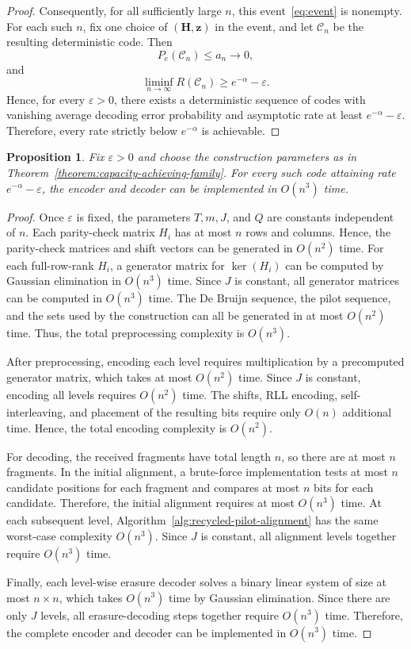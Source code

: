 \documentclass[journal,letterpaper,onecolumn,11pt]{IEEEtran}
\newcommand{\cC}{\mathcal{C}}
\newcommand{\boldz}{\mathbf{z}}
\newcommand{\boldH}{\mathbf{H}}
\newtheorem{proposition}{Proposition}
\begin{document}
\begin{proof}
Consequently, for all sufficiently large \(n\), this event~\eqref{eq:event} is nonempty.
For each such \(n\), fix one choice of \((\boldH,\boldz)\) in the event,
and let \(\cC_n\) be the resulting deterministic code. Then
\[
P_e(\cC_n)\leq a_n\to0,
\]
and
\[
\liminf_{n\to\infty}R(\cC_n)
\geq
e^{-\alpha}-\varepsilon.
\]
Hence, for every \(\varepsilon>0\), there exists a deterministic sequence
of codes with vanishing average decoding error probability and asymptotic
rate at least \(e^{-\alpha}-\varepsilon\). Therefore, every rate strictly
below \(e^{-\alpha}\) is achievable.
\end{proof}

\begin{proposition}\label{proposition:polynomial-time-complexity}
Fix \(\varepsilon>0\) and choose the construction parameters as in
Theorem~\ref{theorem:capacity-achieving-family}. For every such code
attaining rate \(e^{-\alpha}-\varepsilon\), the encoder and decoder can
be implemented in \(O(n^3)\) time.
\end{proposition}
\begin{proof}
Once \(\varepsilon\) is fixed, the parameters \(T,m,J\), and \(Q\) are
constants independent of \(n\). Each parity-check matrix \(H_i\) has at
most \(n\) rows and columns. Hence, the parity-check matrices and shift
vectors can be generated in \(O(n^2)\) time. For each full-row-rank
\(H_i\), a generator matrix for \(\ker(H_i)\) can be computed by
Gaussian elimination in \(O(n^3)\) time. Since \(J\) is constant, all
generator matrices can be computed in \(O(n^3)\) time. The De Bruijn
sequence, the pilot sequence, and the sets used by the construction can
all be generated in at most \(O(n^2)\) time. Thus, the total
preprocessing complexity is \(O(n^3)\).

After preprocessing, encoding each level requires multiplication by a
precomputed generator matrix, which takes at most \(O(n^2)\) time.
Since \(J\) is constant, encoding all levels requires \(O(n^2)\) time.
The shifts, RLL encoding, self-interleaving, and placement of the
resulting bits require only \(O(n)\) additional time. Hence, the total
encoding complexity is \(O(n^2)\).

For decoding, the received fragments have total length \(n\), so there
are at most \(n\) fragments. In the initial alignment, a brute-force
implementation tests at most \(n\) candidate positions for each fragment
and compares at most \(n\) bits for each candidate. Therefore, the
initial alignment requires at most \(O(n^3)\) time. At each subsequent
level, Algorithm~\ref{alg:recycled-pilot-alignment} has the same
worst-case complexity \(O(n^3)\). Since \(J\) is constant, all alignment
levels together require \(O(n^3)\) time.

Finally, each level-wise erasure decoder solves a binary linear system of
size at most \(n\times n\), which takes \(O(n^3)\) time by Gaussian
elimination. Since there are only \(J\) levels, all erasure-decoding
steps together require \(O(n^3)\) time. Therefore, the complete encoder
and decoder can be implemented in \(O(n^3)\) time.
\end{proof}
\printbibliography
\appendices
\end{document}
